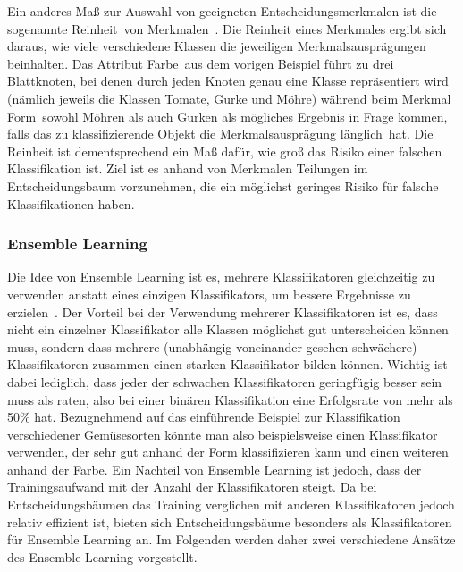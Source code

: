 Ein anderes Maß zur Auswahl von geeigneten Entscheidungsmerkmalen ist die sogenannte \glqq Reinheit\grqq\ von Merkmalen~\cite{Gini}. Die Reinheit eines Merkmales ergibt sich daraus, wie viele verschiedene Klassen die jeweiligen Merkmalsausprägungen beinhalten. Das Attribut \glqq Farbe\grqq\ aus dem vorigen Beispiel führt zu drei Blattknoten, bei denen durch jeden Knoten genau eine Klasse repräsentiert wird (nämlich jeweils die Klassen Tomate, Gurke und Möhre) während beim Merkmal \glqq Form\grqq\ sowohl Möhren als auch Gurken als mögliches Ergebnis in Frage kommen, falls das zu klassifizierende Objekt die Merkmalsausprägung \glqq länglich\grqq\ hat. Die Reinheit ist dementsprechend ein Maß dafür, wie groß das Risiko einer falschen Klassifikation ist. Ziel ist es anhand von Merkmalen Teilungen im Entscheidungsbaum vorzunehmen, die ein möglichst geringes Risiko für falsche Klassifikationen haben.


\subsubsection*{Ensemble Learning}
Die Idee von Ensemble Learning ist es, mehrere Klassifikatoren gleichzeitig zu verwenden anstatt eines einzigen Klassifikators, um bessere Ergebnisse zu erzielen~\cite{Opitz99popularensemble}. Der Vorteil bei der Verwendung mehrerer Klassifikatoren ist es, dass nicht ein einzelner Klassifikator alle Klassen möglichst gut unterscheiden können muss, sondern dass mehrere (unabhängig voneinander gesehen schwächere) Klassifikatoren zusammen einen starken Klassifikator bilden können. Wichtig ist dabei lediglich, dass jeder der schwachen Klassifikatoren geringfügig besser sein muss als raten, also bei einer binären Klassifikation eine Erfolgsrate von mehr als 50\% hat.
Bezugnehmend auf das einführende Beispiel zur Klassifikation verschiedener Gemüsesorten könnte man also beispielsweise einen Klassifikator verwenden, der sehr gut anhand der Form klassifizieren kann und einen weiteren anhand der Farbe. Ein Nachteil von Ensemble Learning ist jedoch, dass der Trainingsaufwand mit der Anzahl der Klassifikatoren steigt. Da bei Entscheidungsbäumen das Training verglichen mit anderen Klassifikatoren jedoch relativ effizient ist, bieten sich Entscheidungsbäume besonders als Klassifikatoren für Ensemble Learning an. Im Folgenden werden daher zwei verschiedene Ansätze des Ensemble Learning vorgestellt.


